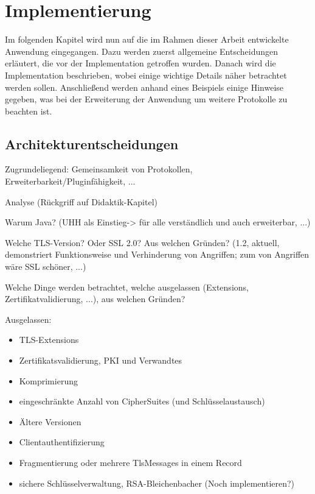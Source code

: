 \chapter{Implementierung}

Im folgenden Kapitel wird nun auf die im Rahmen dieser Arbeit entwickelte Anwendung eingegangen. 
Dazu werden zuerst allgemeine Entscheidungen erläutert, die vor der Implementation getroffen wurden. 
Danach wird die Implementation beschrieben, wobei einige wichtige Details näher betrachtet werden sollen. 
Anschließend werden anhand eines Beispiels einige Hinweise gegeben, was bei der Erweiterung der Anwendung um weitere Protokolle zu beachten ist.

\section{Architekturentscheidungen}

\begin{mdframed}
Zugrundeliegend: Gemeinsamkeit von Protokollen, Erweiterbarkeit/Pluginfähigkeit, ...

Analyse (Rückgriff auf Didaktik-Kapitel)

Warum Java? (UHH als Einstieg-> für alle verständlich und auch erweiterbar, ...)

\hrulefill{}

Welche TLS-Version? Oder SSL 2.0? Aus welchen Gründen? (1.2, aktuell, demonstriert Funktionsweise und Verhinderung von Angriffen; zum  von Angriffen wäre SSL schöner, ...)

Welche Dinge werden betrachtet, welche ausgelassen (Extensions, Zertifikatvalidierung, ...), aus welchen Gründen?

Ausgelassen:
\begin{itemize}
\item TLS-Extensions
\item Zertifikatsvalidierung, PKI und Verwandtes
\item Komprimierung
\item eingeschränkte Anzahl von CipherSuites (und Schlüsselaustausch)
\item Ältere Versionen
\item Clientauthentifizierung
\item Fragmentierung oder mehrere TlsMessages in einem Record
\item sichere Schlüsselverwaltung, RSA-Bleichenbacher (Noch implementieren?) 
\end{itemize}

\end{mdframed}

